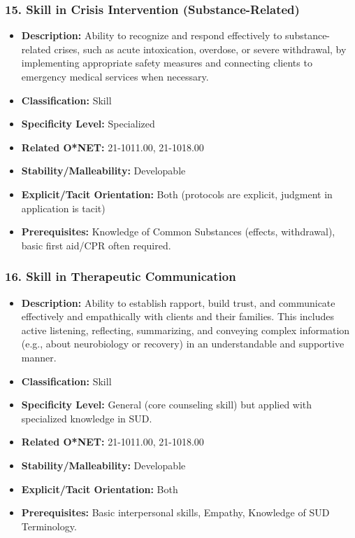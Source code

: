 \documentclass[
  letterpaper,
  DIV=11,
  numbers=noendperiod]{scrartcl}
\providecommand{\tightlist}{%
  \setlength{\itemsep}{0pt}\setlength{\parskip}{0pt}}
\begin{document}
\subsubsection{15. Skill in Crisis Intervention
(Substance-Related)}\label{skill-in-crisis-intervention-substance-related}

\begin{itemize}
\tightlist
\item
  \textbf{Description:} Ability to recognize and respond effectively to
  substance-related crises, such as acute intoxication, overdose, or
  severe withdrawal, by implementing appropriate safety measures and
  connecting clients to emergency medical services when necessary.
\item
  \textbf{Classification:} Skill
\item
  \textbf{Specificity Level:} Specialized
\item
  \textbf{Related O*NET:} 21-1011.00, 21-1018.00
\item
  \textbf{Stability/Malleability:} Developable
\item
  \textbf{Explicit/Tacit Orientation:} Both (protocols are explicit,
  judgment in application is tacit)
\item
  \textbf{Prerequisites:} Knowledge of Common Substances (effects,
  withdrawal), basic first aid/CPR often required.
\end{itemize}

\subsubsection{16. Skill in Therapeutic
Communication}\label{skill-in-therapeutic-communication}

\begin{itemize}
\tightlist
\item
  \textbf{Description:} Ability to establish rapport, build trust, and
  communicate effectively and empathically with clients and their
  families. This includes active listening, reflecting, summarizing, and
  conveying complex information (e.g., about neurobiology or recovery)
  in an understandable and supportive manner.
\item
  \textbf{Classification:} Skill
\item
  \textbf{Specificity Level:} General (core counseling skill) but
  applied with specialized knowledge in SUD.
\item
  \textbf{Related O*NET:} 21-1011.00, 21-1018.00
\item
  \textbf{Stability/Malleability:} Developable
\item
  \textbf{Explicit/Tacit Orientation:} Both
\item
  \textbf{Prerequisites:} Basic interpersonal skills, Empathy, Knowledge
  of SUD Terminology.
\end{itemize}
\end{document}
